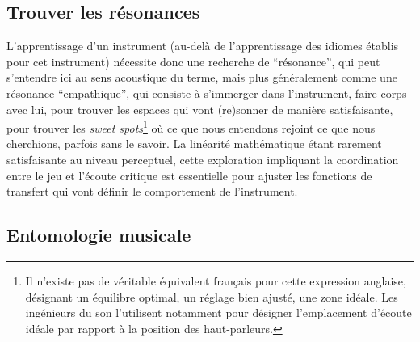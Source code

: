 \subsection{Trouver les résonances}

\noindent L'apprentissage d'un instrument (au-delà de l'apprentissage des idiomes établis pour cet instrument) nécessite donc une recherche de ``résonance'', qui peut s'entendre ici au sens acoustique du terme, mais plus généralement comme une résonance ``empathique'', qui consiste à s'immerger dans l'instrument, faire corps avec lui, pour trouver les espaces qui vont (re)sonner de manière satisfaisante, pour trouver les \textit{sweet spots}\footnote{Il n'existe pas de véritable équivalent français pour cette expression anglaise, désignant un équilibre optimal, un réglage bien ajusté, une zone idéale. Les ingénieurs du son l'utilisent notamment pour désigner l'emplacement d'écoute idéale par rapport à la position des haut-parleurs.} où ce que nous entendons rejoint ce que nous cherchions, parfois sans le savoir. La linéarité mathématique étant rarement satisfaisante au niveau perceptuel, cette exploration impliquant la coordination entre le jeu et l'écoute critique est essentielle pour ajuster les fonctions de transfert qui vont définir le comportement de l'instrument.


\subsection{Entomologie musicale}
\label{sec:ephemeral:vessels}

